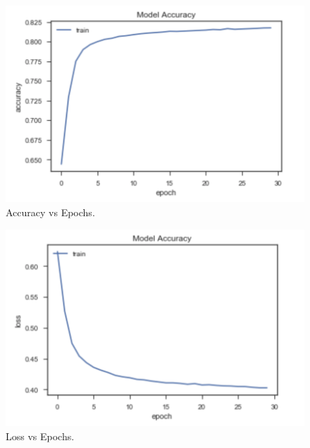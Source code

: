 \documentclass[conference]{IEEEtran}
\begin{document}
\begin{figure}[htbp]
\centerline{\includegraphics[width=\linewidth]{img7.png}}
\caption{Accuracy vs Epochs.}
\label{fig}
\end{figure}


\begin{figure}[htbp]
\centerline{\includegraphics[width=\linewidth]{img8.png}}
\caption{Loss vs Epochs.}
\label{fig}
\end{figure}
\end{document}
